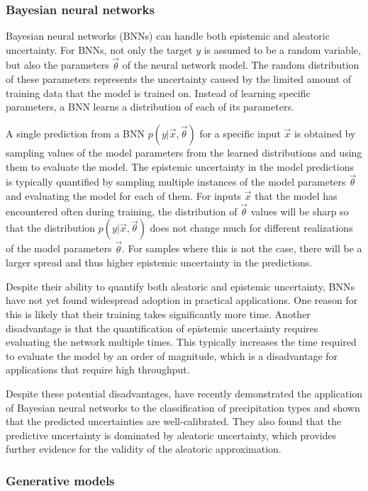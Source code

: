 \subsubsection{Bayesian neural networks}

Bayesian neural networks (BNNs) can handle both epistemic and aleatoric
uncertainty. For BNNs, not only the target $y$ is assumed to be a random
variable, but also the parameters $\vec{\theta}$ of the neural network model. The
random distribution of these parameters represents the uncertainty caused by the
limited amount of training data that the model is trained on. Instead of
learning specific parameters, a BNN learns a distribution of each of its
parameters.

A single prediction from a BNN $p(y|\vec{x}, \vec{\theta})$ for a specific input
$\vec{x}$ is obtained by sampling values of the model parameters from the learned
distributions and using them to evaluate the model. The epistemic uncertainty in
the model predictions is typically quantified by sampling multiple instances of
the model parameters $\vec{\theta}$ and evaluating the model for each of them. For
inputs $\vec{x}$ that the model has encountered often during training, the
distribution of $\vec{\theta}$ values will be sharp so that the distribution
$p(y|\vec{x}, \vec{\theta})$ does not change much for different realizations
of the model parameters $\vec{\theta}$. For
samples where this is not the case, there will be a larger spread and thus
higher epistemic uncertainty in the predictions.

Despite their ability to quantify both aleatoric and epistemic uncertainty, BNNs
have not yet found widespread adoption in practical applications. One reason for
this is likely that their training takes significantly more time. Another
disadvantage is that the quantification of epistemic uncertainty requires
evaluating the network multiple times. This typically increases the time
required to evaluate the model by an order of magnitude, which is a
disadvantage for applications that require high throughput.

Despite these potential disadvantages, \citet{orescanin22} have recently
demonstrated the application of Bayesian neural networks to the classification
of precipitation types and shown that the predicted uncertainties are
well-calibrated. They also found that the predictive uncertainty is dominated by
aleatoric uncertainty, which provides further evidence for the validity of
the aleatoric approximation.

\subsubsection{Generative models}


